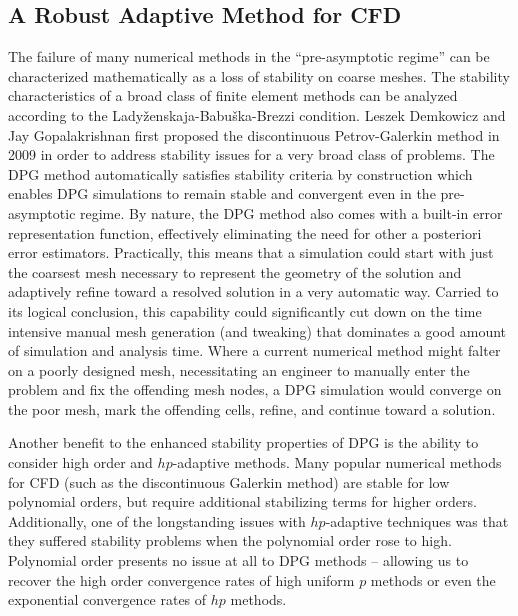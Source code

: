 \documentclass[Proposal.tex]{subfiles}
\begin{document}
\subsection{A Robust Adaptive Method for CFD}
The failure of many numerical methods in the ``pre-asymptotic regime'' can be characterized mathematically as a loss of stability on coarse meshes.
The stability characteristics of a broad class of finite element methods can be analyzed according to the Lady\v{z}enskaja-Babu\v{s}ka-Brezzi condition.
Leszek Demkowicz and Jay Gopalakrishnan first proposed the discontinuous Petrov-Galerkin method in 2009\cite{DPG1} in order to address stability issues for a 
very broad class of problems. The DPG method automatically satisfies stability criteria by construction which enables DPG simulations to remain stable and 
convergent even in the pre-asymptotic regime. 
By nature, the DPG method also comes with a built-in error representation function, effectively eliminating the need for other a posteriori error estimators.
Practically, this means that a simulation could start with just the coarsest mesh necessary to represent the geometry of the solution and adaptively refine toward a resolved solution in a very automatic way.
Carried to its logical conclusion, this capability could significantly cut down on the time intensive manual mesh generation (and tweaking) that dominates a good amount of simulation and analysis time.
Where a current numerical method might falter on a poorly designed mesh, necessitating an engineer to manually enter the problem and fix the offending mesh nodes, a DPG simulation would converge on the poor mesh, mark the offending cells, refine, and continue toward a solution.

Another benefit to the enhanced stability properties of DPG is the ability to consider high order and $hp$-adaptive methods. 
Many popular numerical methods for CFD (such as the discontinuous Galerkin method) are stable for low polynomial orders, but require additional stabilizing terms for higher orders. 
Additionally, one of the longstanding issues with $hp$-adaptive techniques was that they suffered stability problems when the polynomial order rose to high. 
Polynomial order presents no issue at all to DPG methods -- allowing us to recover the high order convergence rates of high uniform $p$ methods or even the exponential convergence rates of $hp$ methods.
\end{document}
